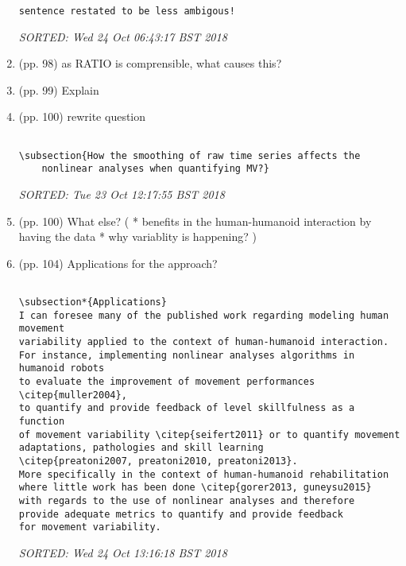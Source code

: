 \documentclass[10pt]{article}
\begin{document}
\begin{enumerate}
\begin{verbatim}
sentence restated to be less ambigous!

\end{verbatim}
\textit{
SORTED: 
Wed 24 Oct 06:43:17 BST 2018
}
\\




\item (pp. 98) as RATIO is comprensible, what causes this?

\item (pp. 99) Explain

\item (pp. 100) rewrite question

\begin{verbatim}

\subsection{How the smoothing of raw time series affects the 
	nonlinear analyses when quantifying MV?}

\end{verbatim}
\textit{
SORTED: 
Tue 23 Oct 12:17:55 BST 2018
}
\\



\item (pp. 100) What else?
	(
	* benefits in the human-humanoid interaction 
	by having the data
	* why variablity is happening?
	)	

\item (pp. 104) Applications for the approach?



\begin{verbatim}

\subsection*{Applications}
I can foresee many of the published work regarding modeling human movement 
variability applied to the context of human-humanoid interaction.
For instance, implementing nonlinear analyses algorithms in humanoid robots 
to evaluate the improvement of movement performances \citep{muller2004}, 
to quantify and provide feedback of level skillfulness as a function 
of movement variability \citep{seifert2011} or to quantify movement 
adaptations, pathologies and skill learning 
\citep{preatoni2007, preatoni2010, preatoni2013}.
More specifically in the context of human-humanoid rehabilitation 
where little work has been done \citep{gorer2013, guneysu2015}
with regards to the use of nonlinear analyses and therefore 
provide adequate metrics to quantify and provide feedback 
for movement variability. 

\end{verbatim}
\textit{
SORTED: 
Wed 24 Oct 13:16:18 BST 2018
}
\\








\end{enumerate}
\end{document}
